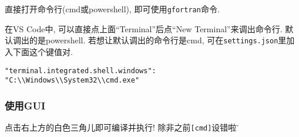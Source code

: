 直接打开命令行(cmd或powershell), 即可使用\verb|gfortran|命令.

在VS Code中, 可以直接点上面``Terminal''后点``New Terminal''来调出命令行. 默认调出的是powershell. 若想让默认调出的命令行是cmd, 可在\verb|settings.json|里加入下面这个键值对.
\begin{lstlisting}
"terminal.integrated.shell.windows":
"C:\\Windows\\System32\\cmd.exe"
\end{lstlisting}

\subsubsection{使用GUI}
点击右上方的白色三角儿即可编译并执行! 除非之前\verb|[cmd]|设错啦$\!\text{\~{}}$
